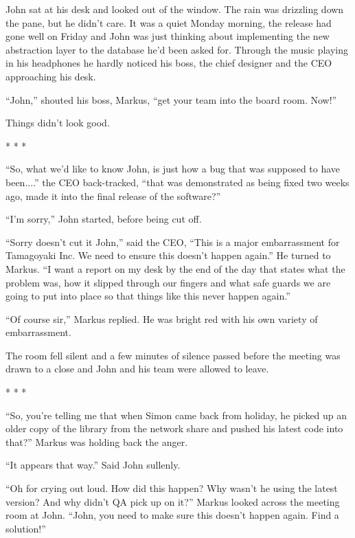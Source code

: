 \begin{trenches}
John sat at his desk and looked out of the window.  The rain was drizzling down the pane, but he didn't care.  It was a quiet Monday morning, the release had gone well on Friday and John was just thinking about implementing the new abstraction layer to the database he'd been asked for.  Through the music playing in his headphones he hardly noticed his boss, the chief designer and the CEO approaching his desk.  

``John,'' shouted his boss, Markus, ``get your team into the board room.  Now!''

Things didn't look good. 
 
\begin{center} * * * \end{center}

``So, what we'd like to know John, is just how a bug that was supposed to have been....'' the CEO back-tracked, ``that was demonstrated as being fixed two weeks ago, made it into the final release of the software?''

``I'm sorry,'' John started, before being cut off.

``Sorry doesn't cut it John,'' said the CEO, ``This is a major embarrassment for Tamagoyaki Inc.  We need to ensure this doesn't happen again.''  He turned to Markus.  ``I want a report on my desk by the end of the day that states what the problem was, how it slipped through our fingers and what safe guards we are going to put into place so that things like this never happen again.''

``Of course sir,'' Markus replied.  He was bright red with his own variety of embarrassment.

The room fell silent and a few minutes of silence passed before the meeting was drawn to a close and John and his team were allowed to leave.

\begin{center} * * * \end{center}

``So, you're telling me that when Simon came back from holiday, he picked up an older copy of the library from the network share and pushed his latest code into that?''  Markus was holding back the anger.

``It appears that way.''  Said John sullenly.

``Oh for crying out loud.  How did this happen?  Why wasn't he using the latest version?  And why didn't QA pick up on it?''  Markus looked across the meeting room at John.  ``John, you need to make sure this doesn't happen again.  Find a solution!''
\end{trenches}

